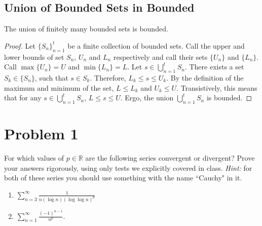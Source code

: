 \documentclass[11pt]{article}
\begin{document}
    \subsection{Union of Bounded Sets in Bounded}
        The union of finitely many bounded sets is bounded.
        \begin{proof}
            Let $\{S_n\}_{n=1}^t$ be a finite collection of bounded sets.
            Call the upper and lower bounds of set $S_n$, $U_n$ and $L_n$ respectively and call their sets $\{U_n\}$ and $\{L_n\}$.
            Call $\max \{U_n\} = U$ and $\min \{L_n\} = L$.
            Let $s \in \bigcup_{n=1}^t S_n$.
            There exists a set $S_k \in \{S_n\}$, such that $s \in S_k$.
            Therefore, $L_k \leq s \leq U_k$.
            By the definition of the maximum and minimum of the set, $L \leq L_k$ and $U_k \leq U$.
            Transistively, this means that for any $s \in \bigcup_{n=1}^t S_n$, $L \leq s \leq U$.
            Ergo, the union $\bigcup_{n=1}^t S_n$ is bounded.
        \end{proof}

\pagebreak
\section{Problem 1}
    For which values of $p \in \mathbb{R}$ are the following series convergent or divergent? Prove your answers rigorously, using only tests we explicitly covered in class. \textit{Hint:} for both of these series you should use something with the name ``Cauchy" in it.
    \begin{enumerate}[label=(\alph*)]
        \item 
        $\displaystyle{\sum_{n = 3}^{\infty} \frac{1}{n(\log n)(\log \log n)^p}}$

        \item 
        $\displaystyle{\sum_{n = 1}^{\infty}} \frac{(-1)^{n - 1}}{n^p}$.
    \end{enumerate}
\end{document}
